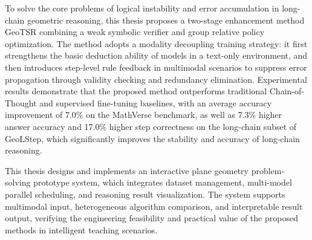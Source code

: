 \begin{englishabstract}
    To solve the core problems of logical instability and error accumulation in long-chain geometric reasoning, this thesis proposes a two-stage enhancement method GeoTSR combining a weak symbolic verifier and group relative policy optimization. The method adopts a modality decoupling training strategy: it first strengthens the basic deduction ability of models in a text-only environment, and then introduces step-level rule feedback in multimodal scenarios to suppress error propagation through validity checking and redundancy elimination. Experimental results demonstrate that the proposed method outperforms traditional Chain-of-Thought and supervised fine-tuning baselines, with an average accuracy improvement of 7.0\% on the MathVerse benchmark, as well as 7.3\% higher answer accuracy and 17.0\% higher step correctness on the long-chain subset of GeoLStep, which significantly improves the stability and accuracy of long-chain reasoning.

    This thesis designs and implements an interactive plane geometry problem-solving prototype system, which integrates dataset management, multi-model parallel scheduling, and reasoning result visualization. The system supports multimodal input, heterogeneous algorithm comparison, and interpretable result output, verifying the engineering feasibility and practical value of the proposed methods in intelligent teaching scenarios.


\end{englishabstract}